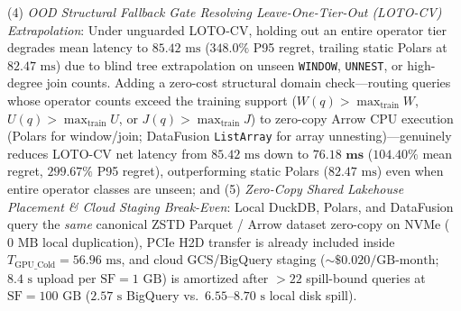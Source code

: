 \documentclass[10pt,a4paper]{article}
\begin{document}
(4) \emph{OOD Structural Fallback Gate Resolving Leave-One-Tier-Out (LOTO-CV) Extrapolation}: Under unguarded LOTO-CV, holding out an entire operator tier degrades mean latency to $85.42\text{ ms}$ ($348.0\%$ P95 regret, trailing static Polars at $82.47\text{ ms}$) due to blind tree extrapolation on unseen \texttt{WINDOW}, \texttt{UNNEST}, or high-degree join counts. Adding a zero-cost structural domain check---routing queries whose operator counts exceed the training support ($W(q) > \max_{\text{train}} W$, $U(q) > \max_{\text{train}} U$, or $J(q) > \max_{\text{train}} J$) to zero-copy Arrow CPU execution (Polars for window/join; DataFusion \texttt{ListArray} for array unnesting)---genuinely reduces LOTO-CV net latency from $85.42\text{ ms}$ down to $\mathbf{76.18\text{ ms}}$ ($104.40\%$ mean regret, $299.67\%$ P95 regret), outperforming static Polars ($82.47\text{ ms}$) even when entire operator classes are unseen; and
(5) \emph{Zero-Copy Shared Lakehouse Placement \& Cloud Staging Break-Even}: Local DuckDB, Polars, and DataFusion query the \emph{same} canonical ZSTD Parquet / Arrow dataset zero-copy on NVMe ($0\text{ MB}$ local duplication), PCIe H2D transfer is already included inside $T_{\text{GPU\_Cold}} = 56.96\text{ ms}$, and cloud GCS/BigQuery staging ($\sim\$0.020/\text{GB-month}$; $8.4\text{ s}$ upload per $\text{SF}=1\text{ GB}$) is amortized after $>22$ spill-bound queries at $\text{SF}=100\text{ GB}$ ($2.57\text{ s}$ BigQuery vs.\ $6.55\text{--}8.70\text{ s}$ local disk spill).
\end{document}
